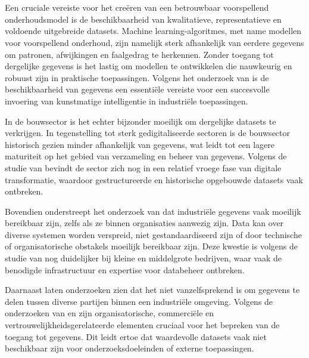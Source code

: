 
\chapter{}%
\label{ch:databeschikbaarheid en uitdagingen bij het verkrijgen}

Een cruciale vereiste voor het creëren van een betrouwbaar voorspellend onderhoudsmodel is de beschikbaarheid van kwalitatieve, representatieve en voldoende uitgebreide datasets. Machine learning-algoritmes, met name modellen voor voorspellend onderhoud, zijn namelijk sterk afhankelijk van eerdere gegevens om patronen, afwijkingen en faalgedrag te herkennen. Zonder toegang tot dergelijke gegevens is het lastig om modellen te ontwikkelen die nauwkeurig en robuust zijn in praktische toepassingen. Volgens het onderzoek van \textcite{Elahi2023} is de beschikbaarheid van gegevens een essentiële vereiste voor een succesvolle invoering van kunstmatige intelligentie in industriële toepassingen.

In de bouwsector is het echter bijzonder moeilijk om dergelijke datasets te verkrijgen. In tegenstelling tot sterk gedigitaliseerde sectoren is de bouwsector historisch gezien minder afhankelijk van gegevens, wat leidt tot een lagere maturiteit op het gebied van verzameling en beheer van gegevens. Volgens de studie van \textcite{Mikulic2024} bevindt de sector zich nog in een relatief vroege fase van digitale transformatie, waardoor gestructureerde en historische opgebouwde datasets vaak ontbreken.

Bovendien onderstreept het onderzoek van \textcite{Wang2025} dat industriële gegevens vaak moeilijk bereikbaar zijn, zelfs als ze binnen organisaties aanwezig zijn. Data kan over diverse systemen worden verspreid, niet gestandaardiseerd zijn of door technische of organisatorische obstakels moeilijk bereikbaar zijn. Deze kwestie is volgens de studie van \textcite{Hu2024} nog duidelijker bij kleine en middelgrote bedrijven, waar vaak de benodigde infrastructuur en expertise voor databeheer ontbreken.

Daarnaast laten onderzoeken zien dat het niet vanzelfsprekend is om gegevens te delen tussen diverse partijen binnen een industriële omgeving. Volgens de onderzoeken van \textcite{Elahi2023} en \textcite{Wang2025} zijn organisatorische, commerciële en vertrouwelijkheidsgerelateerde elementen cruciaal voor het bepreken van de toegang tot gegevens. Dit leidt ertoe dat waardevolle datasets vaak niet beschikbaar zijn voor onderzoeksdoeleinden of externe toepassingen.

